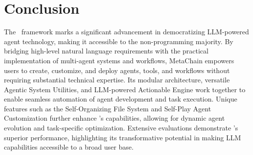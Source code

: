 \section{Conclusion}
The \model\ framework marks a significant advancement in democratizing LLM-powered agent technology, making it accessible to the non-programming majority. By bridging high-level natural language requirements with the practical implementation of multi-agent systems and workflows, MetaChain empowers users to create, customize, and deploy agents, tools, and workflows without requiring substantial technical expertise. Its modular architecture, versatile Agentic System Utilities, and LLM-powered Actionable Engine work together to enable seamless automation of agent development and task execution. Unique features such as the Self-Organizing File System and Self-Play Agent Customization further enhance \model's capabilities, allowing for dynamic agent evolution and task-specific optimization. Extensive evaluations demonstrate \model's superior performance, highlighting its transformative potential in making LLM capabilities accessible to a broad user base.